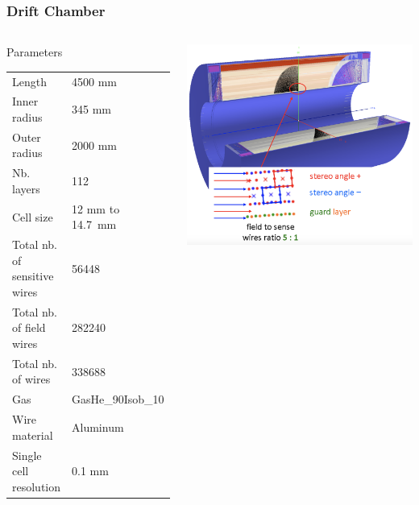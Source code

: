 \documentclass[hyperref={colorlinks=true,pdfpagelabels=false,linkcolor=black}, xcolor=dvipsnames,10pt]{beamer}
\begin{document}
\begin{frame}
	\frametitle{Drift Chamber}
	
	
	\begin{columns}	
		\begin{block}{Parameters}
  \begin{table}
    \begin{adjustbox}{max width=\textwidth}
      \begin{tabular}{l l}
        \toprule
        Length & 4500 mm \\ 
        Inner radius & 345 mm \\
        Outer radius & 2000 mm\\
        Nb. layers & 112 \\
        Cell size & 12 mm to 14.7~mm\\
        Total nb. of sensitive wires & 56448 \\
        Total nb. of field wires & 282240 \\
        Total nb. of wires & 338688 \\
        Gas & GasHe\_90Isob\_10 \\
        Wire material & Aluminum \\
        Single cell resolution & 0.1 mm \\
        \bottomrule
      \end{tabular}
    \end{adjustbox}
  \end{table}
		\end{block}


		\centering
		\includegraphics[width=\textwidth]{../figures/DriftChamber.png}
	\end{columns}
	
	
\end{frame}
\end{document}
